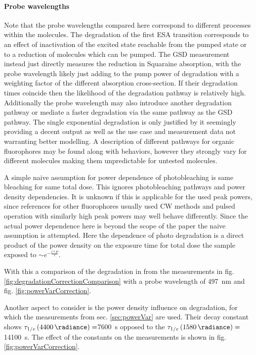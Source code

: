 \documentclass[twoside,openright]{scrreprt}
\begin{document}
\paragraph{Probe wavelengths}
Note that the probe wavelengths compared here correspond to different processes within the molecules. The degradation of the first ESA transition corresponds to an effect of inactivation of the excited state reachable from the pumped state or to a reduction of molecules which can be pumped. The GSD measurement instead just directly measures the reduction in Squaraine absorption, with the probe wavelength likely just adding to the pump power of degradation with a weighting factor of the different absorption cross-section. If their degradation times coincide then the likelihood of the degradation pathway is relatively high. Additionally the probe wavelength may also introduce another degradation pathway or mediate a faster degradation via the same pathway as the GSD pathway. The single exponential degradation is only justified by it seemingly providing a decent output as well as the use case and measurement data not warranting better modelling. A description of different pathways for organic fluorophores may be found along with behaviors, however they strongly vary for different molecules making them unpredictable for untested molecules.\cite{Demchenko_2020}


A simple naive assumption for power dependence of photobleaching is same bleaching for same total dose. This ignores photobleaching pathways and power density dependencies. It is unknown if this is applicable for the used peak powers, since references for other fluorophores usually used CW methods and pulsed operation with similarly high peak powers may well behave differently. Since the actual power dependence here is beyond the scope of the paper the naive assumption is attempted. Here the dependence of photo degradation is a direct product of the power density on the exposure time for total dose the sample exposed to $\sim e^{-\frac{t*P}{\tau}}$.\cite{Eggeling1998}


With this a comparison of the degradation in from the measurements in fig. \ref{fig:degradationCorrectionComparison} with a probe wavelength of \SI{497}{\nano\meter} and fig. \ref{fig:powerVarCorrection}.


Another aspect to consider is the power density influence on degradation, for which the measurements from sec. \ref{sec:powerVar} are used.  Their decay constant shows $\tau_{1/e}\left(\SI{4400}{\radiance}\right)=$\SI{7600}{\second}  opposed to the $\tau_{1/e}\left(\SI{1580}{\radiance}\right)=$\SI{14100}{\second}. The effect of the constants on the measurements is shown in fig. \ref{fig:powerVarCorrection}.
\end{document}
